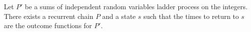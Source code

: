 Let $P'$ be a sums of independent random variables ladder process on the integers. There exists a recurrent chain $P$ and a state $s$ such that the times to return to $s$ are the outcome functions for $P'$.
